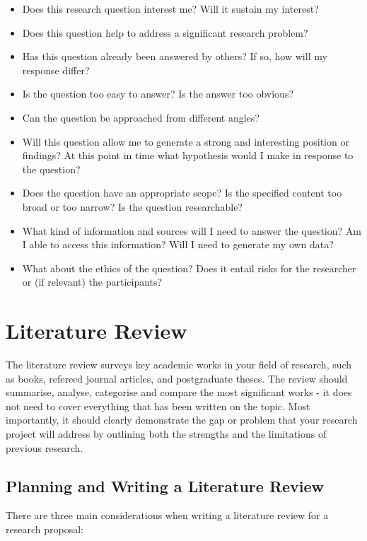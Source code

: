 \documentclass[12pt, a4paper]{article}
\begin{document}
\begin{itemize}
\item Does this research question interest me? Will it sustain my interest?
\item Does this question help to address a significant research problem?
\item Has this question already been answered by others? If so, how will my response differ?
\item Is the question too easy to answer? Is the answer too obvious? 
\item Can the question be approached from different angles? 
\item Will this question allow me to generate a strong and interesting position or findings? At this point in time what hypothesis would I make in response to the question?
\item Does the question have an appropriate scope? Is the specified content too broad or too narrow? 
Is the question researchable? 
\item What kind of information and sources will I need to answer the question?  Am I able to access this information? Will I need to generate my own data?  
\item What about the ethics of the question? Does it entail risks for the researcher or (if relevant) the participants? 
\end{itemize}


\section{Literature Review}
The literature review surveys key academic works in your field of research, such as books, refereed journal articles, and postgraduate theses. The review should summarise, analyse, categorise and compare the most significant works - it does not need to cover everything that has been written on the topic. Most importantly, it should clearly demonstrate the gap or problem that your research project will address by outlining both the strengths and the limitations of previous research.

\subsection{Planning and Writing a Literature Review}

There are three main considerations when writing a literature review for a research proposal:
\end{document}
